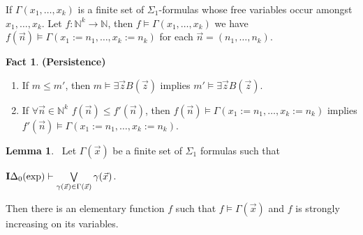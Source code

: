 \documentclass[8pt]{article}
\theoremstyle{definition}
\theoremstyle{definition}
\theoremstyle{definition}
\theoremstyle{definition}
\theoremstyle{definition}
\theoremstyle{definition}
\theoremstyle{definition}
\theoremstyle{definition}
\newtheorem{lemma}{Lemma}[section]
\theoremstyle{definition}
\newtheorem{fact}{Fact}[section]
\theoremstyle{definition}
\theoremstyle{definition}
\theoremstyle{definition}
\theoremstyle{definition}
\theoremstyle{question}
\begin{document}
If $\Gamma(x_1, \dots, x_k)$ is a finite set of $\Sigma_1$-formulas whose free variables occur amongst $x_1, \dots, x_k$.
Let $f : \mathbb{N}^{k} \to \mathbb{N}$, then $f \models \Gamma(x_1, \dots, x_k)$ we have $f(\vec{n}) \models \Gamma(x_1 := n_1, \dots, x_k := n_k)$
for each $\vec{n} = (n_1, \dots, n_k)$.

\begin{fact} {\bf (Persistence)}

  \begin{enumerate}
    \item If $m \leq m'$, then $m \models \exists \vec{z} B(\vec{z})$ implies $m' \models \exists \vec{z} B(\vec{z})$.
    \item If $\forall \vec{n} \in \mathbb{N}^{k}$ $f(\vec{n}) \leq f'(\vec{n})$, 
    then $f(\vec{n}) \models \Gamma(x_1 := n_1, \dots, x_k := n_k)$ implies $f'(\vec{n}) \models \Gamma(x_1 := n_1, \dots, x_k := n_k)$.
  \end{enumerate}
\end{fact}

\begin{lemma}~\label{truth:idelta0}
  Let $\Gamma(\vec{x})$ be a finite set of $\Sigma_1$ formulas such that 
  \begin{center}
  ${\bf I}\Delta_0(\operatorname{exp}) \vdash \bigvee \limits_{\gamma(\vec{x}) \in \Gamma(\vec{x})} \gamma(\vec{x})$.
  \end{center}
  Then there is an elementary function $f$ such that $f \models \Gamma(\vec{x})$ and $f$ is strongly increasing on its variables.
\end{lemma}
\end{document}
